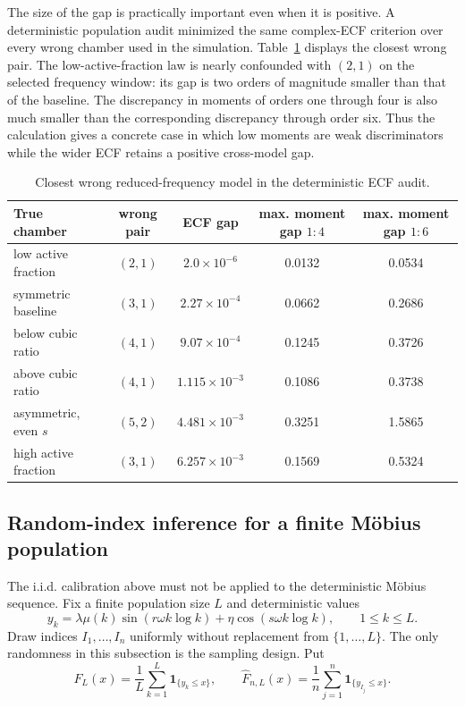 \documentclass[11pt]{amsart}
\numberwithin{equation}{section}\setcounter{tocdepth}{3}\setcounter{secnumdepth}{3}
\begin{document}
The size of the gap is practically important even when it is positive.  A deterministic
population audit minimized the same complex-ECF criterion over every wrong chamber used
in the simulation.  Table~\ref{tab:frequency_near_confusion} displays the closest wrong
pair.  The low-active-fraction law is nearly confounded with $(2,1)$ on the selected
frequency window: its gap is two orders of magnitude smaller than that of the baseline.
The discrepancy in moments of orders one through four is also much smaller than the
corresponding discrepancy through order six.  Thus the calculation gives a concrete
case in which low moments are weak discriminators while the wider ECF retains a positive
cross-model gap.
\begin{table}[htbp]
\centering\small
\caption{Closest wrong reduced-frequency model in the deterministic ECF audit.}
\label{tab:frequency_near_confusion}
\begin{tabular}{lcccc}
\toprule
True chamber & wrong pair & ECF gap & max. moment gap $1{:}4$ & max. moment gap $1{:}6$\\
\midrule
low active fraction & $(2,1)$ & $2.0\times10^{-6}$ & 0.0132 & 0.0534\\
symmetric baseline & $(3,1)$ & $2.27\times10^{-4}$ & 0.0662 & 0.2686\\
below cubic ratio & $(4,1)$ & $9.07\times10^{-4}$ & 0.1245 & 0.3726\\
above cubic ratio & $(4,1)$ & $1.115\times10^{-3}$ & 0.1086 & 0.3738\\
asymmetric, even $s$ & $(5,2)$ & $4.481\times10^{-3}$ & 0.3251 & 1.5865\\
high active fraction & $(3,1)$ & $6.257\times10^{-3}$ & 0.1569 & 0.5324\\
\bottomrule
\end{tabular}
\end{table}

\subsection{Random-index inference for a finite Möbius population}
\label{subsec:random_index_mobius}
\label{subsec:mobius_design_inference}
The i.i.d. calibration above must not be applied to the deterministic Möbius sequence.
Fix a finite population size $L$ and deterministic values
\begin{equation}
 y_k=\lambda\mu(k)\sin(r\omega k\log k)
     +\eta\cos(s\omega k\log k),\qquad 1\le k\le L.
 \label{eq:finite_mobius_population}
\end{equation}
Draw indices $I_1,\ldots,I_n$ uniformly without replacement from
$\{1,\ldots,L\}$.  The only randomness in this subsection is the sampling design.  Put
\begin{equation}
 F_L(x)=\frac1L\sum_{k=1}^L\mathbf1_{\{y_k\le x\}},
 \qquad
 \widehat F_{n,L}(x)=\frac1n\sum_{j=1}^n
 \mathbf1_{\{y_{I_j}\le x\}}.
 \label{eq:finite_population_cdfs}
\end{equation}
\end{document}

